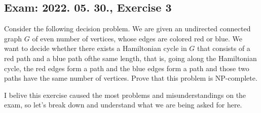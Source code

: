 \subsection{Exam: 2022. 05. 30., Exercise 3}


Consider the following decision problem. We are given an undirected connected
graph $G$ of even number of vertices, whose edges are colored red or blue.
We want to decide whether there exists a Hamiltonian cycle in $G$ that consists
of a red path and a blue path ofthe same length, that is, going along the
Hamiltonian cycle, the red edges form a path and the blue edges form a path
and those two paths have the same number of vertices. Prove that this problem
is NP-complete.


I belive this exercise caused the most problems and misunderstandings on the exam,
so let's break down and understand what we are being asked for here.

